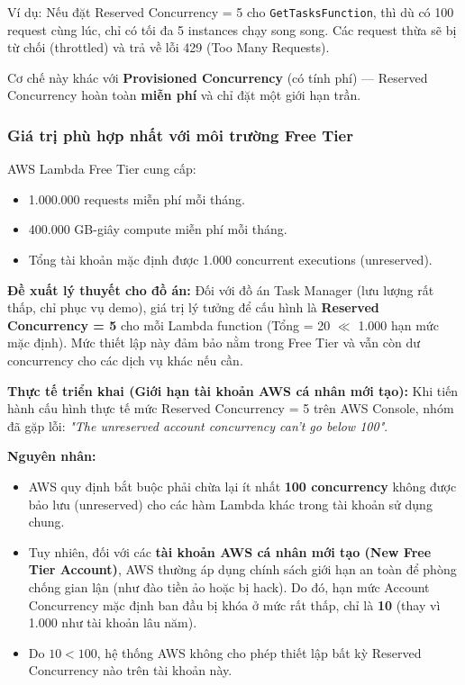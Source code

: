 \documentclass[13pt]{article}
\begin{document}
Ví dụ: Nếu đặt Reserved Concurrency = 5 cho \texttt{GetTasksFunction}, thì dù có 100 request cùng lúc, chỉ có tối đa 5 instances chạy song song. Các request thừa sẽ bị từ chối (throttled) và trả về lỗi 429 (Too Many Requests).

Cơ chế này khác với \textbf{Provisioned Concurrency} (có tính phí) — Reserved Concurrency hoàn toàn \textbf{miễn phí} và chỉ đặt một giới hạn trần.

\subsubsection{Giá trị phù hợp nhất với môi trường Free Tier}
AWS Lambda Free Tier cung cấp:
\begin{itemize}
    \item 1.000.000 requests miễn phí mỗi tháng.
    \item 400.000 GB-giây compute miễn phí mỗi tháng.
    \item Tổng tài khoản mặc định được 1.000 concurrent executions (unreserved).
\end{itemize}

\textbf{Đề xuất lý thuyết cho đồ án:}
Đối với đồ án Task Manager (lưu lượng rất thấp, chỉ phục vụ demo), giá trị lý tưởng để cấu hình là \textbf{Reserved Concurrency = 5} cho mỗi Lambda function (Tổng = 20 $\ll$ 1.000 hạn mức mặc định). Mức thiết lập này đảm bảo nằm trong Free Tier và vẫn còn dư concurrency cho các dịch vụ khác nếu cần.

\textbf{Thực tế triển khai (Giới hạn tài khoản AWS cá nhân mới tạo):}
Khi tiến hành cấu hình thực tế mức Reserved Concurrency = 5 trên AWS Console, nhóm đã gặp lỗi: \textit{"The unreserved account concurrency can't go below 100"}.

\textbf{Nguyên nhân:} 
\begin{itemize}
    \item AWS quy định bắt buộc phải chừa lại ít nhất \textbf{100 concurrency} không được bảo lưu (unreserved) cho các hàm Lambda khác trong tài khoản sử dụng chung.
    \item Tuy nhiên, đối với các \textbf{tài khoản AWS cá nhân mới tạo (New Free Tier Account)}, AWS thường áp dụng chính sách giới hạn an toàn để phòng chống gian lận (như đào tiền ảo hoặc bị hack). Do đó, hạn mức Account Concurrency mặc định ban đầu bị khóa ở mức rất thấp, chỉ là \textbf{10} (thay vì 1.000 như tài khoản lâu năm).
    \item Do $10 < 100$, hệ thống AWS không cho phép thiết lập bất kỳ Reserved Concurrency nào trên tài khoản này.
\end{itemize}
\end{document}
